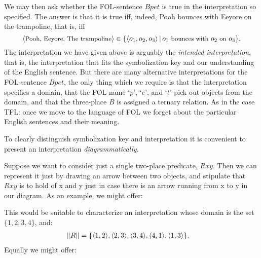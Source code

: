 We may then ask whether the FOL-sentence $Bpet$ is true in the interpretation so specified. The answer is that it is true iff, indeed, Pooh bounces with Eeyore on the trampoline, that is, iff
$${\small \langle \text{Pooh, Eeyore, The trampoline}\rangle\in\{\langle o_1,o_2,o_3\rangle\,|\,o_1\text{ bounces with }o_2\text{ on }o_3\}.}$$
The interpretation we have given above is arguably the \emph{intended interpretation}, that is, the interpretation that fits the symbolization key and our understanding of the English sentence. But there are many alternative interpretations for the FOL-sentence $Bpet$, the only thing which we require is that the interpretation specifies a domain, that the FOL-name `$p$', `$e$', and `$t$' pick out objects from the domain, and that the three-place $B$ is assigned a ternary relation. As in the case TFL: once we move to the language of FOL we forget about the particular English sentences and their meaning.


To clearly distinguish symbolization key and interpretation it is convenient to present an interpretation \emph{diagrammatically}.


Suppose we want to consider just a single two-place predicate, $Rxy$. Then we can represent it just by drawing an arrow between two objects, and stipulate that $Rxy$ is to hold of x and y just in case there is an arrow running from x to y in our diagram. As an example, we might offer:
\begin{center}
\end{center}
This would be suitable to characterize an interpretation whose domain is the set $\{1,2,3,4\}$, and:
	\begin{align*}\|R\|&=\{
		\mathopen{\langle}1, 2\mathclose{\rangle},
		\mathopen{\langle}2, 3\mathclose{\rangle},
		\mathopen{\langle}3, 4\mathclose{\rangle},
		\mathopen{\langle}4, 1\mathclose{\rangle},
		\mathopen{\langle}1, 3\mathclose{\rangle}\}.
	\end{align*}
Equally we might offer:

